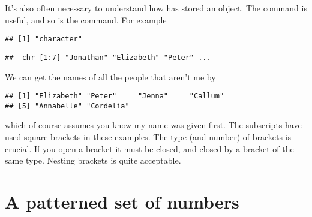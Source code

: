 It's also often necessary to understand how \R{} has stored an object. The  command is useful, and so is the  command. For example 
\begin{knitrout}
\color{fgcolor}\begin{kframe}
\begin{alltt}
\end{alltt}
\begin{verbatim}
## [1] "character"
\end{verbatim}
\begin{alltt}
\end{alltt}
\begin{verbatim}
##  chr [1:7] "Jonathan" "Elizabeth" "Peter" ...
\end{verbatim}
\end{kframe}
\end{knitrout}
We can get the names of all the people that aren't me by 
\begin{knitrout}
\color{fgcolor}\begin{kframe}
\begin{alltt}
\hlstd{Names[}\hlopt{-}\hlstd{]}
\end{alltt}
\begin{verbatim}
## [1] "Elizabeth" "Peter"     "Jenna"     "Callum"   
## [5] "Annabelle" "Cordelia"
\end{verbatim}
\end{kframe}
\end{knitrout}
which of course assumes you know my name was given first. The subscripts have used square brackets in these examples. The type (and number) of brackets is crucial. If you open a bracket it must be closed, and closed by a bracket of the same type. Nesting brackets is quite acceptable. 
 
 
\section{A patterned set of numbers} 
 
